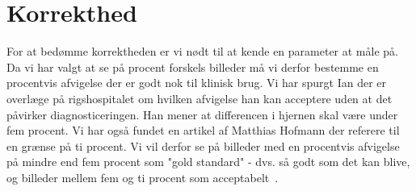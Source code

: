 \section{Korrekthed}

For at bedømme korrektheden er vi nødt til at kende en parameter at måle på. Da vi har valgt at se på procent forskels billeder må vi derfor bestemme en procentvis afvigelse der er godt nok til klinisk brug. Vi har spurgt Ian der er overlæge på rigshospitalet om hvilken afvigelse han kan acceptere uden at det påvirker diagnosticeringen. Han mener at differencen i hjernen skal være under fem procent. Vi har også fundet en artikel af Matthias Hofmann der referere til en grænse på ti procent. Vi vil derfor se på billeder med en procentvis afvigelse på mindre end fem procent som "gold standard" - dvs. så godt som det kan blive, og billeder mellem fem og ti procent som acceptabelt~\cite{accepteretAfvigelse}.